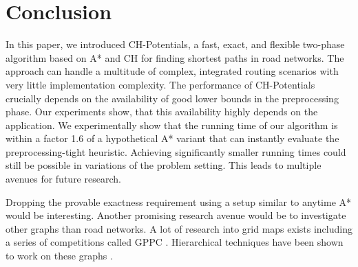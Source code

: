 \documentclass[a4paper,USenglish,cleveref, autoref, thm-restate]{lipics-v2019}
\begin{document}
\section{Conclusion}
\label{sec:conclusion}

In this paper, we introduced CH-Potentials, a fast, exact, and flexible two-phase algorithm based on A* and CH for finding shortest paths in road networks.
The approach can handle a multitude of complex, integrated routing scenarios with very little implementation complexity.
The performance of CH-Potentials crucially depends on the availability of good lower bounds in the preprocessing phase.
Our experiments show, that this availability highly depends on the application.
We experimentally show that the running time of our algorithm is within a factor 1.6 of a hypothetical A* variant that can instantly evaluate the preprocessing-tight heuristic.
Achieving significantly smaller running times could still be possible in variations of the problem setting.
This leads to multiple avenues for future research.

Dropping the provable exactness requirement using a setup similar to anytime A* \cite{DBLP:conf/aaai/ZhouH02,DBLP:conf/nips/LikhachevGT03} would be interesting.
Another promising research avenue would be to investigate other graphs than road networks.
A lot of research into grid maps exists including a series of competitions called GPPC \cite{DBLP:conf/socs/SturtevantTTUKS15}.
Hierarchical techniques have been shown to work on these graphs \cite{DBLP:conf/aaai/UrasK14}.



\pagebreak


\end{document}
